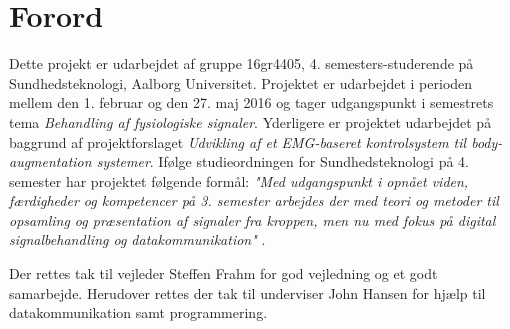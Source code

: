 \chapter*{Forord}
Dette projekt er udarbejdet af gruppe 16gr4405, 4. semesters-studerende på Sundhedsteknologi, Aalborg Universitet. Projektet er udarbejdet i perioden mellem den 1. februar og den 27. maj 2016 og tager udgangspunkt i semestrets tema \textit{Behandling af fysiologiske signaler}. Yderligere er projektet udarbejdet på baggrund af projektforslaget \textit{Udvikling af et EMG-baseret kontrolsystem til body-augmentation systemer}. Ifølge studieordningen for Sundhedsteknologi på 4. semester har projektet følgende formål: \textit{"Med udgangspunkt i opnået viden, færdigheder og kompetencer på 3. semester arbejdes der med teori og metoder til opsamling og præsentation af signaler fra kroppen, men nu med fokus på digital signalbehandling og datakommunikation"} \citep{aalborguniversitet2014}.

Der rettes tak til vejleder Steffen Frahm for god vejledning og et godt samarbejde. Herudover rettes der tak til underviser John Hansen for hjælp til datakommunikation samt programmering. 